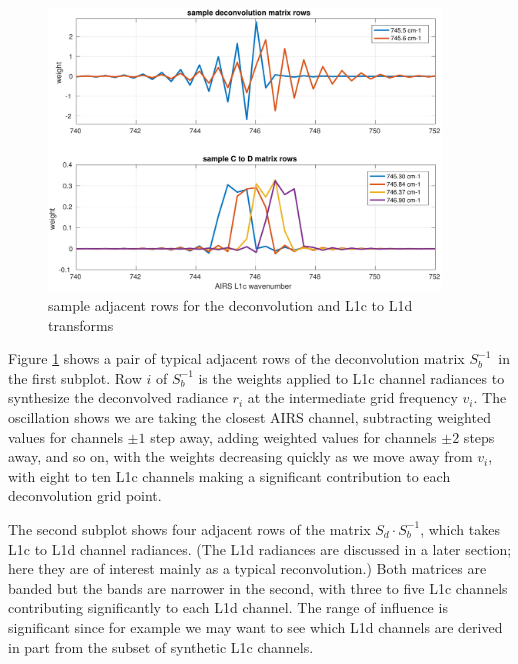 \documentclass[11pt]{article}
\begin{document}


\begin{figure} %
  \centering
  \includegraphics[height=7.5cm]{figures/airs_decon_basis.pdf}
  \caption{sample adjacent rows for the deconvolution and L1c to L1d
    transforms}
  \label{dbasis}
\end{figure}

Figure \ref{dbasis} shows a pair of typical adjacent rows of the
deconvolution matrix $S_b^{-1}$\, in the first subplot.  Row $i$ of
$S_b^{-1}$ is the weights applied to L1c channel radiances to
synthesize the deconvolved radiance $r_i$ at the intermediate grid
frequency $v_i$.  The oscillation shows we are taking the closest
AIRS channel, subtracting weighted values for channels $\pm 1$ step
away, adding weighted values for channels $\pm 2$ steps away, and so
on, with the weights decreasing quickly as we move away from $v_i$,
with eight to ten L1c channels making a significant contribution to
each deconvolution grid point.

The second subplot shows four adjacent rows of the matrix 
$S_d \cdot S_b^{-1}$, which takes L1c to L1d channel radiances.
(The L1d radiances are discussed in a later section; here they are
of interest mainly as a typical reconvolution.)  Both matrices are
banded but the bands are narrower in the second, with three to five
L1c channels contributing significantly to each L1d channel.  
The range of influence is significant since for example we may want
to see which L1d channels are derived in part from the subset of
synthetic L1c channels.
\end{document}
